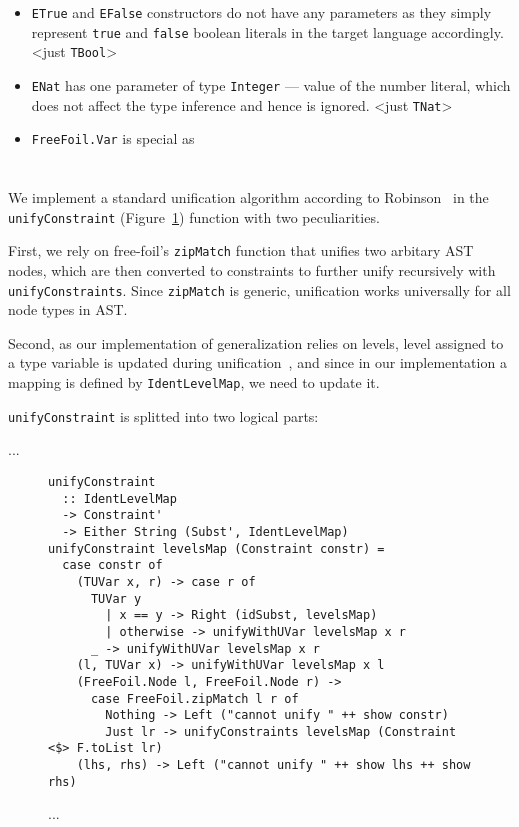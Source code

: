 \begin{itemize}
  \item \texttt{ETrue} and \texttt{EFalse} constructors do not have any parameters as they simply represent \texttt{true} and \texttt{false} boolean literals in the target language accordingly. \textless just \texttt{TBool}\textgreater
  \item \texttt{ENat} has one parameter of type \texttt{Integer} — value of the number literal, which does not affect the type inference and hence is ignored. \textless just \texttt{TNat}\textgreater
  \item \texttt{FreeFoil.Var} is special as
\end{itemize}

\section{}

We implement a standard unification algorithm according to Robinson~\cite{Robinson1965} in the \texttt{unifyConstraint} (Figure~\ref{fig:unifyConstraint}) function with two peculiarities.

First, we rely on free-foil's \texttt{zipMatch} function that unifies two arbitary AST nodes, which are then converted to constraints to further unify recursively with \texttt{unifyConstraints}. Since \texttt{zipMatch} is generic, unification works universally for all node types in AST.

Second, as our implementation of generalization relies on levels, level assigned to a type variable is updated during unification~\cite{Kiselyov2022_OCamplTypeChecker}, and since in our implementation a mapping is defined by \texttt{IdentLevelMap}, we need to update it.

\texttt{unifyConstraint} is splitted into two logical parts:

...

\begin{figure}[H]
  \begin{verbatim}
unifyConstraint
  :: IdentLevelMap
  -> Constraint'
  -> Either String (Subst', IdentLevelMap)
unifyConstraint levelsMap (Constraint constr) =
  case constr of
    (TUVar x, r) -> case r of
      TUVar y
        | x == y -> Right (idSubst, levelsMap)
        | otherwise -> unifyWithUVar levelsMap x r
      _ -> unifyWithUVar levelsMap x r
    (l, TUVar x) -> unifyWithUVar levelsMap x l
    (FreeFoil.Node l, FreeFoil.Node r) ->
      case FreeFoil.zipMatch l r of
        Nothing -> Left ("cannot unify " ++ show constr)
        Just lr -> unifyConstraints levelsMap (Constraint <$> F.toList lr)
    (lhs, rhs) -> Left ("cannot unify " ++ show lhs ++ show rhs)
  \end{verbatim}
  \caption{...}
  \label{fig:unifyConstraint}
\end{figure}

